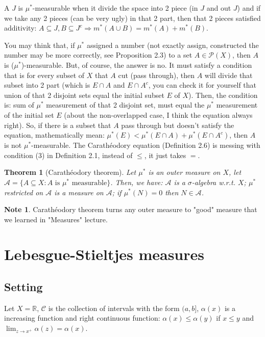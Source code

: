 \documentclass[11pt,a4paper]{article}
\theoremstyle{definition}
\newtheorem{note}[definition]{Note}
\theoremstyle{plain}
\newtheorem{theorem}[definition]{Theorem}
\newcommand{\R}{\mathbb{R}}
\newcommand{\A}{\mathcal{A}}
\begin{document}
\begin{mynote}
A $J$ is $\mu^*$-measurable when it divide the space into 2 piece (in $J$ and out $J$) and if we take any 2 pieces (can be very ugly) in that 2 part, then that 2 pieces satisfied additivity: $A\subseteq J, B\subseteq J^c \Rightarrow m^*(A\cup B) = m^*(A) + m^*(B)$.
\end{mynote}

\begin{mynote}
You may think that, if $\mu^*$ assigned a number (not exactly assign, constructed the number may be more correctly, see Proposition 2.3) to a set $A \in \mathcal{P}(X)$, then $A$ is ($\mu^*$)-measurable. But, of course, the answer is no. It must satisfy a condition that is for every subset of $X$ that $A$ cut (pass through), then $A$ will divide that subset into 2 part (which is $E \cap A$ and $E\cap A^c$, you can check it for yourself that union of that 2 disjoint sets equal the initial subset $E$ of $X$). Then, the condition is: sum of $\mu^*$ measurement of that 2 disjoint set, must equal the $\mu^*$ measurement of the initial set $E$ (about the non-overlapped case, I think the equation always right). So, if there is a subset that $A$ pass through but doesn't satisfy the equation, mathematically mean: $\mu^*(E) < \mu^*(E \cap A) + \mu^*(E\cap A^c)$, then $A$ is not $\mu^*$-measurable. The Carathéodory equation (Definition 2.6) is messing with condition (3) in Definition 2.1, instead of $\le$, it just takes $=$.
\end{mynote}

\begin{theorem}[Carathéodory theorem]
Let $\mu^*$ is an outer measure on $X$, let $\A =\{A\subseteq X: A \text{ is }\mu^* \text{ measurable}\}$. Then, we have: $\A$ is a $\sigma$-algebra w.r.t. $X$; $\mu^*$ restricted on $\A$ is a measure on $\A$; if $\mu^*(N) = 0$ then $N \in \A$.
\end{theorem}

\begin{note}
Carathéodory theorem turns any outer measure to "good" measure that we learned in "Measures" lecture.
\end{note}

\section{Lebesgue-Stieltjes measures}
\subsection{Setting}
Let $X = \R$, $\mathcal{C}$ is the collection of intervals with the form $(a,b]$, $\alpha(x)$ is a increasing function and right continuous function: $\alpha(x) \le \alpha(y)$ if $x \le y$ and $\lim_{z\rightarrow x^+}\alpha(z) = \alpha(x)$.
\end{document}
